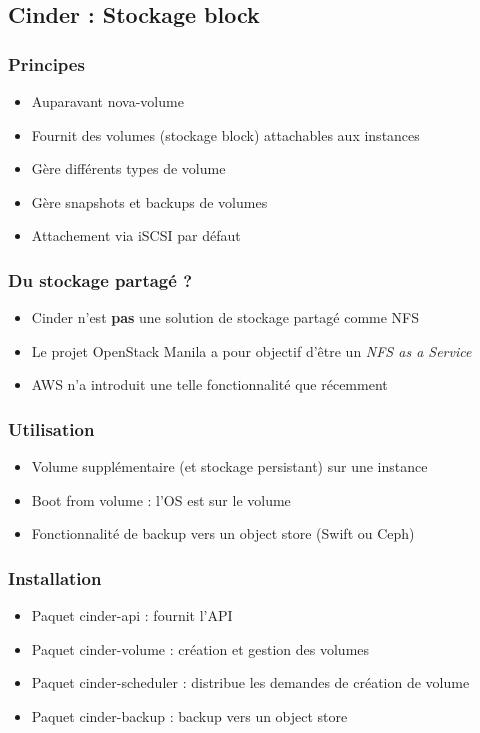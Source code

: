   \subsection[Cinder]{Cinder : Stockage block}

  \begin{frame}
    \frametitle{Principes}
    \begin{itemize}
      \item Auparavant nova-volume
      \item Fournit des volumes (stockage block) attachables aux instances
      \item Gère différents types de volume
      \item Gère snapshots et backups de volumes
      \item Attachement via iSCSI par défaut
    \end{itemize}
  \end{frame}

  \begin{frame}
    \frametitle{Du stockage partagé ?}
    \begin{itemize}
      \item Cinder n'est \textbf{pas} une solution de stockage partagé comme NFS
      \item Le projet OpenStack Manila a pour objectif d'être un \textit{NFS as a Service}
      \item AWS n'a introduit une telle fonctionnalité que récemment
    \end{itemize}
  \end{frame}

  \begin{frame}
    \frametitle{Utilisation}
    \begin{itemize}
      \item Volume supplémentaire (et stockage persistant) sur une instance
      \item Boot from volume : l'OS est sur le volume
      \item Fonctionnalité de backup vers un object store (Swift ou Ceph)
    \end{itemize}
  \end{frame}

  \begin{frame}
    \frametitle{Installation}
    \begin{itemize}
      \item Paquet cinder-api : fournit l'API
      \item Paquet cinder-volume : création et gestion des volumes
      \item Paquet cinder-scheduler : distribue les demandes de création de volume
      \item Paquet cinder-backup : backup vers un object store
    \end{itemize}
  \end{frame}

